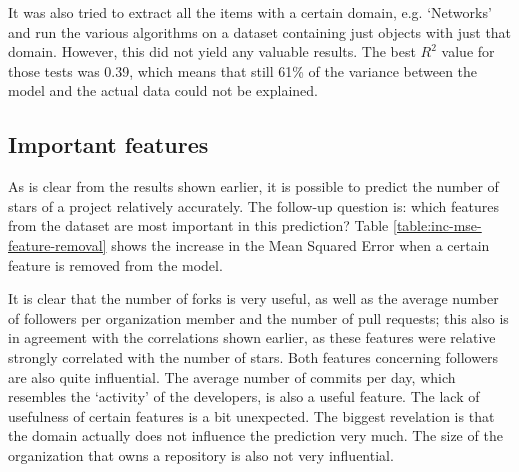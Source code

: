                 
        It was also tried to extract all the items with a certain domain, e.g. `Networks' and run the various algorithms on a dataset containing just objects with just that domain. However, this did not yield any valuable results. 
        The best $R^2$ value for those tests was 0.39, which means that still 61\% of the variance between the model and the actual data could not be explained.
        
        
    \subsection{Important features}
        As is clear from the results shown earlier, it is possible to predict the number of stars of a project relatively accurately. 
        The follow-up question is: which features from the dataset are most important in this prediction? 
        Table \ref{table:inc-mse-feature-removal} shows the increase in the Mean Squared Error when a certain feature is removed from the model.
     
     It is clear that the number of forks is very useful, as well as the average number of followers per organization member and the number of pull requests; this also is in agreement with the correlations shown earlier, as these features were relative strongly correlated with the number of stars. Both features concerning followers are also quite influential. 
     The average number of commits per day, which resembles the `activity' of the developers, is also a useful feature.
     The lack of usefulness of certain features is a bit unexpected. The biggest revelation is that the domain actually does not influence the prediction very much. The size of the organization that owns a repository is also not very influential.
     
